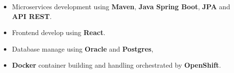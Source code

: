 \documentclass[letterpaper]{style} %
\begin{document}

\newpage %

\makeprofileSecond %

\begin{itemize}
	\item Microservices development using \textbf{Maven}, \textbf{Java Spring Boot}, \textbf{JPA} and \textbf{API REST}.
	\item Frontend develop using \textbf{React}.
	\item Database manage using \textbf{Oracle} and \textbf{Postgres},
	\item \textbf{Docker} container building and handling orchestrated by \textbf{OpenShift}.
\end{itemize}




\end{document}
